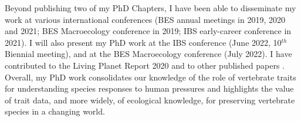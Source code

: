 Beyond publishing two of my PhD Chapters, I have been able to disseminate my work at various international conferences (BES annual meetings in 2019, 2020 and 2021; BES Macroecology conference in 2019; IBS early-career conference in 2021). I will also present my PhD work at the IBS conference (June 2022, 10$^{th}$ Biennial meeting), and at the BES Macroecology conference (July 2022). I have contributed to the Living Planet Report 2020 \citep{WWF2020} and to other published papers \citep{Newbold2019, Newbold2020}. Overall, my PhD work consolidates our knowledge of the role of vertebrate traits for understanding species responses to human pressures and highlights the value of trait data, and more widely, of ecological knowledge, for preserving vertebrate species in a changing world.